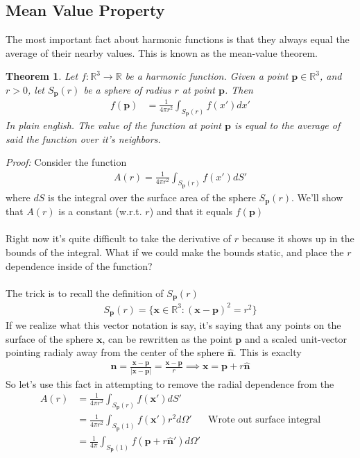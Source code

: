 \documentclass[12pt,fleqn]{article}
\numberwithin{equation}{section} %
\newtheorem{theorem}{Theorem}
\begin{document}
\subsection{Mean Value Property}
The most important fact about harmonic functions is that they always equal the average of their nearby values. This is known as the mean-value theorem.
\begin{theorem}
	Let $f: \mathbb R^3 \to \mathbb R$ be a harmonic function. Given a point $\mathbf p \in \mathbb R^3$, and $r > 0$, let $S_{\mathbf p}(r)$ be a sphere of radius $r$ at point $\mathbf p$. Then
	\begin{align}
		f(\mathbf p)&  = \frac{1}{4\pi r^2} \int_{S_{\mathbf p}(r)} f(x') dx'
	\end{align}
	In plain english. The value of the function at point $\mathbf p$ is equal to the average of said the function over it's neighbors.  
\end{theorem}
\emph{Proof:} Consider the function
\begin{align}
	A(r) = \frac{1}{4\pi r^2} \int_{S_{\mathbf p}(r)} f(x') dS'
\end{align}
where $dS$ is the integral over the surface area of the sphere $S_{\mathbf p}(r)$.
We'll show that $A(r)$ is a constant (w.r.t. $r$) and that it equals $f(\mathbf p)$\\
\\
Right now it's quite difficult to take the derivative of $r$ because it shows up in the bounds of the integral. What if we could make the bounds static, and place the $r$ dependence inside of the function?
\\
\\
The trick is to recall the definition of $S_{\mathbf p}(r)$
\begin{align}
	S_{\mathbf p}(r) = \{ \mathbf x \in \mathbb R^3 : (\mathbf x -\mathbf p)^2 = r^2\}
\end{align}
If we realize what this vector notation is say, it's saying that any points on the surface of the sphere $\mathbf x$, can be rewritten as the point $\mathbf p$ and a scaled unit-vector pointing radialy away from the center of the sphere $\mathbf{\hat n}$. This is exaclty
\begin{align}
	\mathbf{\hat n} = \frac{\mathbf x - \mathbf p}{|\mathbf x - \mathbf p|} = \frac{\mathbf x - \mathbf p}{r} \implies \mathbf x = \mathbf p + r \mathbf{\hat n}
\end{align}
So let's use this fact in attempting to remove the radial dependence from the 
\begin{align}
	A(r) & = \frac{1}{4\pi r^2} \int_{S_{\mathbf p}(r)} f(\mathbf x') dS'\\
	& = \frac{1}{4\pi r^2} \int_{S_{\mathbf p}(1)} f(\mathbf x') r^2 d\Omega' & \text{Wrote out surface integral}\\
	& = \frac{1}{4\pi} \int_{S_{\mathbf p}(1)} f(\mathbf p + r \mathbf{\hat n}') d\Omega'
\end{align}
\end{document}
